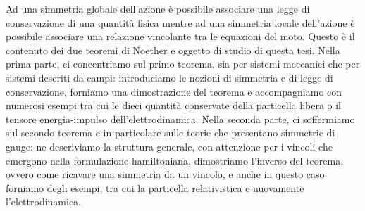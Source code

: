 \begin{Abstract}
\begin{changemargin}{1cm}{1cm}
    Ad una simmetria globale dell'azione è possibile associare una legge di conservazione di una quantità fisica mentre ad una simmetria locale dell'azione è possibile associare una relazione vincolante tra le equazioni del moto. Questo è il contenuto dei due teoremi di Noether e oggetto di studio di questa tesi. Nella prima parte, ci concentriamo sul primo teorema, sia per sistemi meccanici che per sistemi descriti da campi: introduciamo le nozioni di simmetria e di legge di conservazione, forniamo una dimostrazione del teorema e accompagniamo con numerosi esempi tra cui le dieci quantità conservate della particella libera o il tensore energia-impulso dell'elettrodinamica. Nella seconda parte, ci soffermiamo sul secondo teorema e in particolare sulle teorie che presentano simmetrie di gauge: ne descriviamo la struttura generale, con attenzione per i vincoli che emergono nella formulazione hamiltoniana, dimostriamo l'inverso del teorema, ovvero come ricavare una simmetria da un vincolo, e anche in questo caso forniamo degli esempi, tra cui la particella relativistica e nuovamente l'elettrodinamica. 
\end{changemargin}
\end{Abstract}